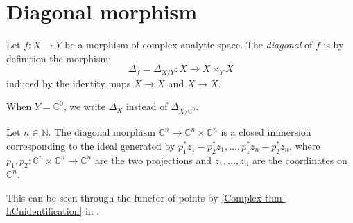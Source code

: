 \section{Diagonal morphism}

\begin{definition}
    Let $f:X\rightarrow Y$ be a morphism of complex analytic space. The \emph{diagonal} of $f$ is by definition the morphism:
    \[
        \Delta_f=\Delta_{X/Y}: X\rightarrow X\times_Y X
    \]  
    induced by the identity maps $X\rightarrow X$ and $X\rightarrow X$.

    When $Y=\mathbb{C}^0$, we write $\Delta_X$ instead of $\Delta_{X/\mathbb{C}^0}$.
\end{definition}

\begin{example}\label{ex-Cndiagonalcloim}
    Let $n\in \mathbb{N}$.
    The diagonal morphism $\mathbb{C}^n\rightarrow \mathbb{C}^n\times \mathbb{C}^n$ is a closed immersion corresponding to the ideal generated by $p_1^*z_1-p_2^*z_1,\ldots,p_1^*z_n-p_2^*z_n$, where $p_1,p_2:\mathbb{C}^n\times \mathbb{C}^n\rightarrow \mathbb{C}^n$ are the two projections and $z_1,\ldots,z_n$ are the coordinates on $\mathbb{C}^n$. 

    This can be seen through the functor of points by \cref{Complex-thm-hCnidentification} in .
\end{example}

